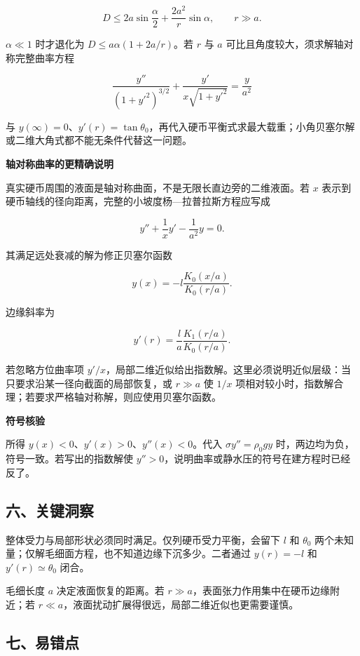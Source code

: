 \documentclass[12pt,a4paper,UTF8]{ctexart}
\begin{document}
\[\boxed{D\le2a\sin\frac\alpha2+\frac{2a^2}r\sin\alpha},\qquad r\gg a.\]

\(\alpha\ll1\) 时才退化为 \(D\le a\alpha(1+2a/r)\)。若 \(r\) 与 \(a\)
可比且角度较大，须求解轴对称完整曲率方程

\[\frac{y''}{(1+y'^2)^{3/2}}+
\frac{y'}{x\sqrt{1+y'^2}}=\frac y{a^2}\]

与
\(y(\infty)=0\)、\(y'(r)=\tan\theta_0\)，再代入硬币平衡式求最大载重；小角贝塞尔解或二维大角式都不能无条件代替这一问题。

\textbf{轴对称曲率的更精确说明}

真实硬币周围的液面是轴对称曲面，不是无限长直边旁的二维液面。若 \(x\)
表示到硬币轴线的径向距离，完整的小坡度杨---拉普拉斯方程应写成

\[
y''+\frac1x y'-\frac1{a^2}y=0.
\]

其满足远处衰减的解为修正贝塞尔函数

\[
y(x)=-l\frac{K_0(x/a)}{K_0(r/a)}.
\]

边缘斜率为

\[
y'(r)=\frac la\frac{K_1(r/a)}{K_0(r/a)}.
\]

若忽略方位曲率项
\(y'/x\)，局部二维近似给出指数解。这里必须说明近似层级：当只要求沿某一径向截面的局部恢复，或
\(r\gg a\) 使 \(1/x\)
项相对较小时，指数解合理；若要求严格轴对称解，则应使用贝塞尔函数。

\textbf{符号核验}

所得 \(y(x)<0\)、\(y'(x)>0\)、\(y''(x)<0\)。代入 \(\sigma y''=\rho_0gy\)
时，两边均为负，符号一致。若写出的指数解使
\(y''>0\)，说明曲率或静水压的符号在建方程时已经反了。

\subsection{六、关键洞察}\label{ux516dux5173ux952eux6d1eux5bdf-1}

整体受力与局部形状必须同时满足。仅列硬币受力平衡，会留下 \(l\) 和
\(\theta_0\) 两个未知量；仅解毛细面方程，也不知道边缘下沉多少。二者通过
\(y(r)=-l\) 和 \(y'(r)\simeq\theta_0\) 闭合。

毛细长度 \(a\) 决定液面恢复的距离。若
\(r\gg a\)，表面张力作用集中在硬币边缘附近；若
\(r\ll a\)，液面扰动扩展得很远，局部二维近似也更需要谨慎。

\subsection{七、易错点}\label{ux4e03ux6613ux9519ux70b9-1}
\end{document}
